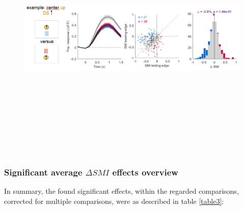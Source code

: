 \begin{figure}[H] \centering \includegraphics[width=12cm,height=12cm,keepaspectratio]{Figures/7.Results/finalPopulation/sel/diagrams/24.png} 
\end{figure}\label{24}

\subsubsection{Significant average $\Delta SMI$ effects overview}

In summary, the found significant effects, within the regarded comparisons, corrected for multiple comparisons, were as described in table \ref{table3}:

